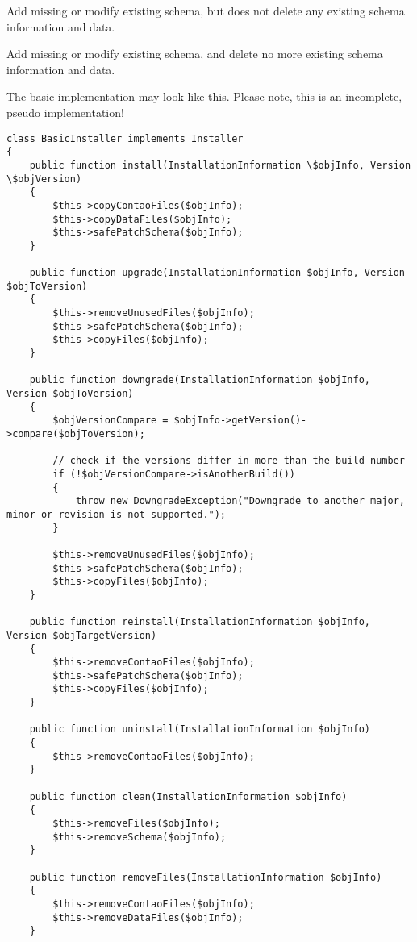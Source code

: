 \vspace{.5cm}
 Add missing or modify existing schema, but does not delete any existing schema information and data.

\vspace{.5cm}
 Add missing or modify existing schema, and delete no more existing schema information and data.

\vspace{.5cm}
The basic implementation may look like this. Please note, this is an incomplete, pseudo implementation!

\begin{lstlisting}[caption=Basic Installer Implementation Code]
class BasicInstaller implements Installer
{
	public function install(InstallationInformation \$objInfo, Version \$objVersion)
	{
		$this->copyContaoFiles($objInfo);
		$this->copyDataFiles($objInfo);
		$this->safePatchSchema($objInfo);
	}
	
	public function upgrade(InstallationInformation $objInfo, Version $objToVersion)
	{
		$this->removeUnusedFiles($objInfo);
		$this->safePatchSchema($objInfo);
		$this->copyFiles($objInfo);
	}
	
	public function downgrade(InstallationInformation $objInfo, Version $objToVersion)
	{
		$objVersionCompare = $objInfo->getVersion()->compare($objToVersion);
		
		// check if the versions differ in more than the build number
		if (!$objVersionCompare->isAnotherBuild())
		{
			throw new DowngradeException("Downgrade to another major, minor or revision is not supported.");
		}
		
		$this->removeUnusedFiles($objInfo);
		$this->safePatchSchema($objInfo);
		$this->copyFiles($objInfo);
	}
	
	public function reinstall(InstallationInformation $objInfo, Version $objTargetVersion)
	{
		$this->removeContaoFiles($objInfo);
		$this->safePatchSchema($objInfo);
		$this->copyFiles($objInfo);
	}
	
	public function uninstall(InstallationInformation $objInfo)
	{
		$this->removeContaoFiles($objInfo);
	}
	
	public function clean(InstallationInformation $objInfo)
	{
		$this->removeFiles($objInfo);
		$this->removeSchema($objInfo);
	}
	
	public function removeFiles(InstallationInformation $objInfo)
	{
		$this->removeContaoFiles($objInfo);
		$this->removeDataFiles($objInfo);
	}
	

\end{lstlisting}
